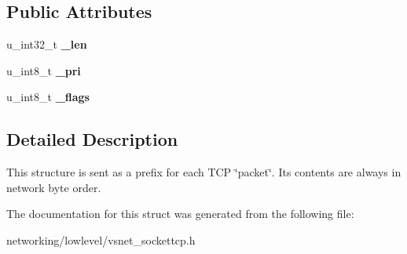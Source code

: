 \subsection*{Public Attributes}
\begin{DoxyCompactItemize}
\item 
u\+\_\+int32\+\_\+t {\bfseries \+\_\+len}\hypertarget{structVsnetTCPSocket_1_1Header_aa07ea0dd579b2ecdbded8cb7aa4c5ea6}{}\label{structVsnetTCPSocket_1_1Header_aa07ea0dd579b2ecdbded8cb7aa4c5ea6}

\item 
u\+\_\+int8\+\_\+t {\bfseries \+\_\+pri}\hypertarget{structVsnetTCPSocket_1_1Header_a236e54246edf5e8956ebce2ef7966d09}{}\label{structVsnetTCPSocket_1_1Header_a236e54246edf5e8956ebce2ef7966d09}

\item 
u\+\_\+int8\+\_\+t {\bfseries \+\_\+flags}\hypertarget{structVsnetTCPSocket_1_1Header_aaac7bf23669b859950c2f5c6689e2bda}{}\label{structVsnetTCPSocket_1_1Header_aaac7bf23669b859950c2f5c6689e2bda}

\end{DoxyCompactItemize}


\subsection{Detailed Description}
This structure is sent as a prefix for each T\+CP \char`\"{}packet\char`\"{}. It\textquotesingle{}s contents are always in network byte order. 

The documentation for this struct was generated from the following file\+:\begin{DoxyCompactItemize}
\item 
networking/lowlevel/vsnet\+\_\+sockettcp.\+h\end{DoxyCompactItemize}
